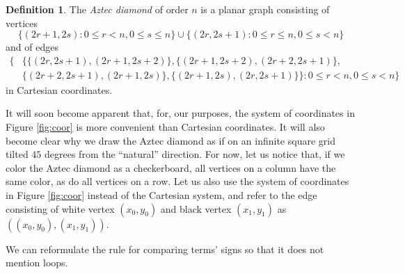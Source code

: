 \documentclass[10pt,reqno]{amsart}
\theoremstyle{plain}
\theoremstyle{definition}
\newtheorem{Def}{Definition}
\theoremstyle{remark}
\begin{document}
\begin{Def}
The {\em Aztec diamond} of order $n$ is a planar graph
consisting of vertices 
\begin{equation}
\{(2r+1,2s) : 0\leq r < n, 0\leq s \leq n\} \cup
\{(2r,2s+1) : 0\leq r \leq n, 0\leq s < n \}
\end{equation}
and of edges
\begin{equation}
\begin{aligned}
\{&\{\{(2r,2s+1),(2r+1,2s+2)\},
   \{(2r+1,2s+2),(2r+2,2s+1)\}, \\
   &\{(2r+2,2s+1),(2r+1,2s)\},
   \{(2r+1,2s),(2r,2s+1)\}\} : 0\leq r< n, 0\leq s < n \}
\end{aligned}
\end{equation}
in Cartesian coordinates.
\end{Def}

It will soon become apparent that, for, our purposes, the
system of coordinates in Figure \ref{fig:coor} is more convenient than
Cartesian coordinates. It will also become clear why we draw
the Aztec diamond as if on an infinite square grid tilted $45$ degrees
from the ``natural'' direction. For now, let us notice that, if we
color the Aztec diamond as a checkerboard, all vertices on a column
have the same color, as do all vertices on a row. Let us also
use the system of coordinates in Figure 
\ref{fig:coor} instead of the Cartesian 
system, and refer to the edge consisting of white vertex $(x_0,y_0)$
and black vertex $(x_1,y_1)$ as $((x_0,y_0),(x_1,y_1))$.

We can reformulate the rule for comparing terms' signs so
that it does not mention loops.
\end{document}
